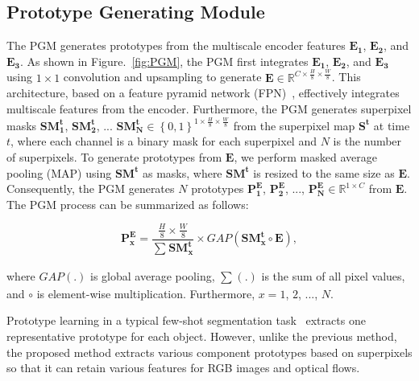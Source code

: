 \documentclass[10pt,twocolumn,letterpaper]{article}
\begin{document}
\subsection{Prototype Generating Module}
The PGM generates prototypes from the multiscale encoder features $\mathbf{E_{1}}$, $\mathbf{E_{2}}$, and $\mathbf{E_{3}}$. As shown in Figure.~\ref{fig:PGM}, the PGM first integrates $\mathbf{E_{1}}$, $\mathbf{E_{2}}$, and $\mathbf{E_{3}}$ using $1 \times 1$ convolution and upsampling to generate $\mathbf{E} \in \mathbb{R} ^ {C \times \frac{H}{8} \times \frac{W}{8}}$. This architecture, based on a feature pyramid network (FPN)~\cite{lin2017feature}, effectively integrates multiscale features from the encoder. Furthermore, the PGM generates superpixel masks $\mathbf{SM^t_1}$, $\mathbf{SM^t_2}$, ... $\mathbf{SM^t_N} \in \left\{0, 1\right\} ^ {1 \times \frac{H}{8} \times \frac{W}{8}}$ from the superpixel map $\mathbf{S^t}$ at time $t$, where each channel is a binary mask for each superpixel and $N$ is the number of superpixels. To generate prototypes from $\mathbf{E}$, we perform masked average pooling (MAP) using $\mathbf{SM^t}$ as masks, where $\mathbf{SM^t}$ is resized to the same size as $\mathbf{E}$. Consequently, the PGM generates $N$ prototypes $\mathbf{P^{E}_1}$, $\mathbf{P^{E}_2}$, ..., $\mathbf{P^{E}_N} \in \mathbb{R} ^ {1 \times C}$ from $\mathbf{E}$. The PGM process can be summarized as follows: 

\begin{equation}
	\mathbf{P _ { x } ^ { E }} = \frac{ \frac{H}{8} \times \frac{W}{8} } { \sum _ { } ^ { } \mathbf{SM _ { x } ^ { t }} } \times GAP \left ( \mathbf{SM _ { x } ^ { t }} \circ \mathbf{E} \right ),
\end{equation}

\noindent
where $GAP\left(.\right)$ is global average pooling, $\sum _ { } ^ { } \left(.\right)$ is the sum of all pixel values, and $\circ$ is element-wise multiplication. Furthermore, $x = 1$, $2$, ..., $N$. 

Prototype learning in a typical few-shot segmentation task~\cite{dong2018few, wang2019panet, liu2020part, yang2020prototype, yu2021location, li2021adaptive} extracts one representative prototype for each object. However, unlike the previous method, the proposed method extracts various component prototypes based on superpixels so that it can retain various features for RGB images and optical flows.
\end{document}
